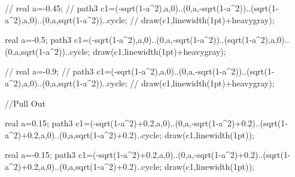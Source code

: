     //	real a=-0.45;
	//	path3 c1=(-sqrt(1-a^2),a,0)..(0,a,-sqrt(1-a^2))..(sqrt(1-a^2),a,0)..(0,a,sqrt(1-a^2))..cycle;
    //	draw(c1,linewidth(1pt)+heavygray);
    	
    	real a=-0.5;
		path3 c1=(-sqrt(1-a^2),a,0)..(0,a,-sqrt(1-a^2))..(sqrt(1-a^2),a,0)..(0,a,sqrt(1-a^2))..cycle;
    	draw(c1,linewidth(1pt)+heavygray);
    	
    //	real a=-0.9;
	//	path3 c1=(-sqrt(1-a^2),a,0)..(0,a,-sqrt(1-a^2))..(sqrt(1-a^2),a,0)..(0,a,sqrt(1-a^2))..cycle;
    //	draw(c1,linewidth(1pt)+heavygray);
    	
    	//Pull Out
    	
    	real a=0.15;
		path3 c1=(-sqrt(1-a^2)+0.2,a,0)..(0,a,-sqrt(1-a^2)+0.2)..(sqrt(1-a^2)+0.2,a,0)..(0,a,sqrt(1-a^2)+0.2)..cycle;
    	draw(c1,linewidth(1pt));
    	
    	real a=-0.15;
		path3 c1=(-sqrt(1-a^2)+0.2,a,0)..(0,a,-sqrt(1-a^2)+0.2)..(sqrt(1-a^2)+0.2,a,0)..(0,a,sqrt(1-a^2)+0.2)..cycle;
    	draw(c1,linewidth(1pt));
        
